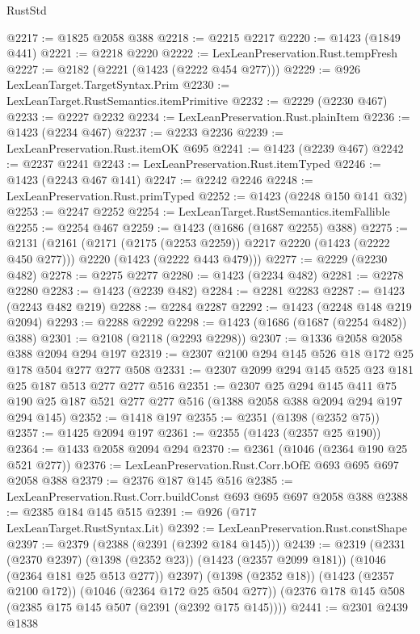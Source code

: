 \begin{lexlean}{RustStd}
\begin{coremodule}
{\begin{coremodule}
{{{{{{{{@2217 := @1825 @2058 @388
@2218 := @2215 @2217
@2220 := @1423 (@1849 @441)
@2221 := @2218 @2220
@2222 := LexLeanPreservation.Rust.tempFresh
@2227 := @2182 (@2221 (@1423 (@2222 @454 @277)))
@2229 := @926 LexLeanTarget.TargetSyntax.Prim
@2230 := LexLeanTarget.RustSemantics.itemPrimitive
@2232 := @2229 (@2230 @467)
@2233 := @2227 @2232
@2234 := LexLeanPreservation.Rust.plainItem
@2236 := @1423 (@2234 @467)
@2237 := @2233 @2236
@2239 := LexLeanPreservation.Rust.itemOK @695
@2241 := @1423 (@2239 @467)
@2242 := @2237 @2241
@2243 := LexLeanPreservation.Rust.itemTyped
@2246 := @1423 (@2243 @467 @141)
@2247 := @2242 @2246
@2248 := LexLeanPreservation.Rust.primTyped
@2252 := @1423 (@2248 @150 @141 @32)
@2253 := @2247 @2252
@2254 := LexLeanTarget.RustSemantics.itemFallible
@2255 := @2254 @467
@2259 := @1423 (@1686 (@1687 @2255) @388)
@2275 := @2131
    (@2161
      (@2171 (@2175 (@2253 @2259)) @2217 @2220 (@1423 (@2222 @450 @277)))
      @2220
      (@1423 (@2222 @443 @479)))
@2277 := @2229 (@2230 @482)
@2278 := @2275 @2277
@2280 := @1423 (@2234 @482)
@2281 := @2278 @2280
@2283 := @1423 (@2239 @482)
@2284 := @2281 @2283
@2287 := @1423 (@2243 @482 @219)
@2288 := @2284 @2287
@2292 := @1423 (@2248 @148 @219 @2094)
@2293 := @2288 @2292
@2298 := @1423 (@1686 (@1687 (@2254 @482)) @388)
@2301 := @2108 (@2118 (@2293 @2298))
@2307 := @1336 @2058 @2058 @388 @2094 @294 @197
@2319 := @2307 @2100 @294 @145 @526 @18 @172 @25 @178 @504 @277 @277 @508
@2331 := @2307 @2099 @294 @145 @525 @23 @181 @25 @187 @513 @277 @277 @516
@2351 := @2307
    @25
    @294
    @145
    @411
    @75
    @190
    @25
    @187
    @521
    @277
    @277
    @516
    (@1388 @2058 @388 @2094 @294 @197 @294 @145)
@2352 := @1418 @197
@2355 := @2351 (@1398 (@2352 @75))
@2357 := @1425 @2094 @197
@2361 := @2355 (@1423 (@2357 @25 @190))
@2364 := @1433 @2058 @2094 @294
@2370 := @2361 (@1046 (@2364 @190 @25 @521 @277))
@2376 := LexLeanPreservation.Rust.Corr.bOfE @693 @695 @697 @2058 @388
@2379 := @2376 @187 @145 @516
@2385 := LexLeanPreservation.Rust.Corr.buildConst @693 @695 @697 @2058 @388
@2388 := @2385 @184 @145 @515
@2391 := @926 (@717 LexLeanTarget.RustSyntax.Lit)
@2392 := LexLeanPreservation.Rust.constShape
@2397 := @2379 (@2388 (@2391 (@2392 @184 @145)))
@2439 := @2319
    (@2331
      (@2370 @2397)
      (@1398 (@2352 @23))
      (@1423 (@2357 @2099 @181))
      (@1046 (@2364 @181 @25 @513 @277))
      @2397)
    (@1398 (@2352 @18))
    (@1423 (@2357 @2100 @172))
    (@1046 (@2364 @172 @25 @504 @277))
    (@2376 @178 @145 @508 (@2385 @175 @145 @507 (@2391 (@2392 @175 @145))))
@2441 := @2301 @2439 @1838
}}}}}}}}
\end{coremodule}}
\end{coremodule}
\end{lexlean}
